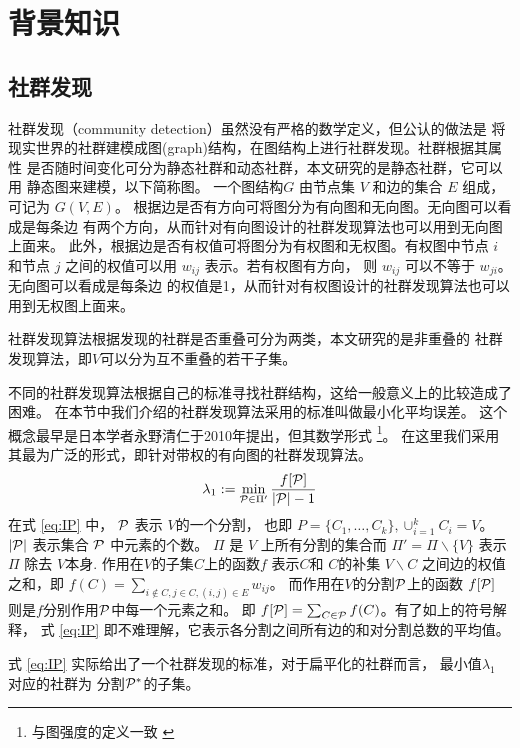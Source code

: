 
\chapter{背景知识}

\section{社群发现}\label{sec:community_detection}

社群发现（community detection）虽然没有严格的数学定义，但公认的做法是
将现实世界的社群建模成图(graph)结构，在图结构上进行社群发现。社群根据其属性
是否随时间变化可分为静态社群和动态社群，本文研究的是静态社群，它可以用
静态图来建模，以下简称图。
一个图结构$G$ 由节点集 $V$ 和边的集合 $E$ 组成，可记为 $G(V,E)$。
根据边是否有方向可将图分为有向图和无向图。无向图可以看成是每条边
有两个方向，从而针对有向图设计的社群发现算法也可以用到无向图上面来。
此外，根据边是否有权值可将图分为有权图和无权图。有权图中节点 $i$
和节点 $j$ 之间的权值可以用 $w_{ij}$ 表示。若有权图有方向，
则 $w_{ij}$ 可以不等于 $w_{ji}$。
无向图可以看成是每条边
的权值是1，从而针对有权图设计的社群发现算法也可以用到无权图上面来。

社群发现算法根据发现的社群是否重叠可分为两类，本文研究的是非重叠的
社群发现算法，即$V$可以分为互不重叠的若干子集。

不同的社群发现算法根据自己的标准寻找社群结构，这给一般意义上的比较造成了困难。
在本节中我们介绍的社群发现算法采用的标准叫做最小化平均误差。
这个概念最早是日本学者永野清仁于2010年提出\cite{mac}，但其数学形式
\footnote{与图强度的定义一致 \cite{cunningham1985optimal}}。
在这里我们采用其最为广泛的形式，即针对带权的有向图的社群发现算法。
\begin{equation}\label{eq:IP}
  \lambda_1 := \min_{\P \in \Pi'}\frac{ f[\P] }{  \abs{\P} - 1 } 
\end{equation}
在式 \eqref{eq:IP} 中，
$\P$ 表示 $V$的一个分割， 也即  $P=\{C_1, \dots, C_k\}, \cup_{i=1}^k C_i=V$。
$\abs{\mathcal{P}}$ 表示集合 $\P$ 中元素的个数。
$\Pi$ 是 $V$ 上所有分割的集合而 $\Pi'=\Pi\backslash\{V\}$ 表示 $\Pi$
除去 $V$本身.
作用在$V$的子集$C$上的函数$f$
表示$C$和 $C$的补集 $V\backslash C$ 之间边的权值之和，即
$f(C)=\sum_{i \not\in C, j\in C, (i,j) \in E} w_{ij}$。
而作用在$V$的分割$\P$上的函数 $f[\P]$ 则是$f$分别作用$\P$中每一个元素之和。
即 $f[\P]=\sum_{C \in \P} f(C)$。有了如上的符号解释，
式 \eqref{eq:IP} 即不难理解，它表示各分割之间所有边的和对分割总数的平均值。

式 \eqref{eq:IP} 实际给出了一个社群发现的标准，对于扁平化的社群而言，
最小值$\lambda_1$ 对应的社群为
分割$\P^*$的子集。


